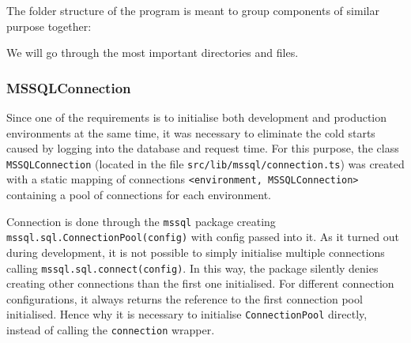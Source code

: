 The folder structure of the program is meant to group components of similar purpose together:

We will go through the most important directories and files.



\subsubsection{MSSQLConnection}
Since one of the requirements is to initialise both development and production environments at the same time, it was necessary to eliminate the cold starts caused by logging into the database and request time. 
For this purpose, the class \texttt{MSSQLConnection} (located in the file \texttt{src/lib/mssql/connection.ts}) was created with a static mapping of connections \texttt{<environment, MSSQLConnection>} containing a pool of connections for each environment.

Connection is done through the \texttt{mssql} package creating \\ \texttt{mssql.sql.ConnectionPool(config)} with config passed into it.
As it turned out during development, it is not possible to simply initialise multiple connections calling \texttt{mssql.sql.connect(config)}.
In this way, the package silently denies creating other connections than the first one initialised.
For different connection configurations, it always returns the reference to the first connection pool initialised.
Hence why it is necessary to initialise \texttt{ConnectionPool} directly, instead of calling the \texttt{connection} wrapper.

